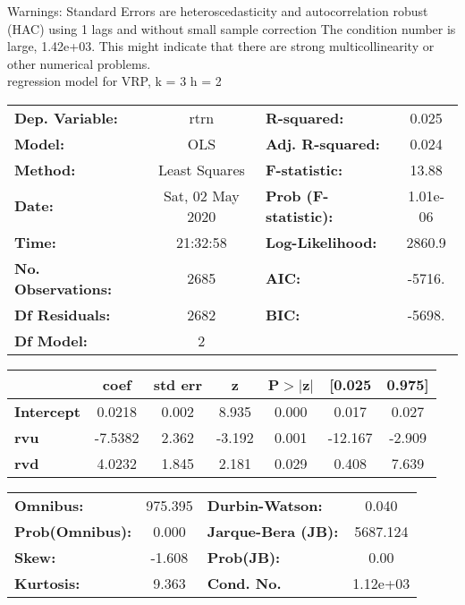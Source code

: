 Warnings: \newline
 [1] Standard Errors are heteroscedasticity and autocorrelation robust (HAC) using 1 lags and without small sample correction \newline
 [2] The condition number is large, 1.42e+03. This might indicate that there are \newline
 strong multicollinearity or other numerical problems.\\ 

regression model for VRP, k = 3 h = 2\begin{center}
\begin{tabular}{lclc}
\toprule
\textbf{Dep. Variable:}    &       rtrn       & \textbf{  R-squared:         } &     0.025   \\
\textbf{Model:}            &       OLS        & \textbf{  Adj. R-squared:    } &     0.024   \\
\textbf{Method:}           &  Least Squares   & \textbf{  F-statistic:       } &     13.88   \\
\textbf{Date:}             & Sat, 02 May 2020 & \textbf{  Prob (F-statistic):} &  1.01e-06   \\
\textbf{Time:}             &     21:32:58     & \textbf{  Log-Likelihood:    } &    2860.9   \\
\textbf{No. Observations:} &        2685      & \textbf{  AIC:               } &    -5716.   \\
\textbf{Df Residuals:}     &        2682      & \textbf{  BIC:               } &    -5698.   \\
\textbf{Df Model:}         &           2      & \textbf{                     } &             \\
\bottomrule
\end{tabular}
\begin{tabular}{lcccccc}
                   & \textbf{coef} & \textbf{std err} & \textbf{z} & \textbf{P$> |$z$|$} & \textbf{[0.025} & \textbf{0.975]}  \\
\midrule
\textbf{Intercept} &       0.0218  &        0.002     &     8.935  &         0.000        &        0.017    &        0.027     \\
\textbf{rvu}       &      -7.5382  &        2.362     &    -3.192  &         0.001        &      -12.167    &       -2.909     \\
\textbf{rvd}       &       4.0232  &        1.845     &     2.181  &         0.029        &        0.408    &        7.639     \\
\bottomrule
\end{tabular}
\begin{tabular}{lclc}
\textbf{Omnibus:}       & 975.395 & \textbf{  Durbin-Watson:     } &    0.040  \\
\textbf{Prob(Omnibus):} &   0.000 & \textbf{  Jarque-Bera (JB):  } & 5687.124  \\
\textbf{Skew:}          &  -1.608 & \textbf{  Prob(JB):          } &     0.00  \\
\textbf{Kurtosis:}      &   9.363 & \textbf{  Cond. No.          } & 1.12e+03  \\
\bottomrule
\end{tabular}
\end{center}

